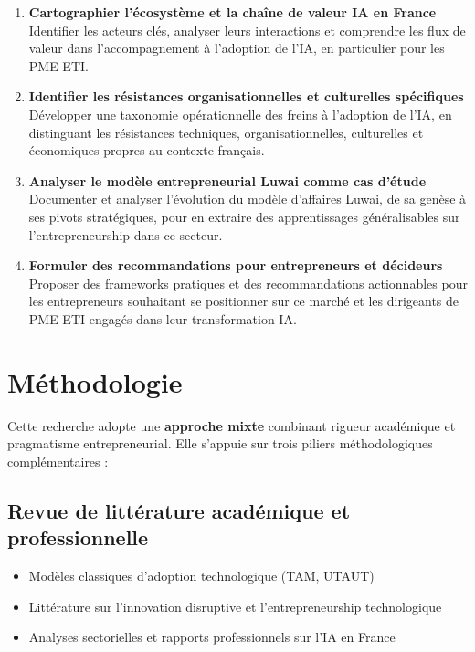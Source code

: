 \begin{enumerate}
    \item \textbf{Cartographier l'écosystème et la chaîne de valeur IA en France}\\
    Identifier les acteurs clés, analyser leurs interactions et comprendre les flux de valeur dans l'accompagnement à l'adoption de l'IA, en particulier pour les PME-ETI.
    \item \textbf{Identifier les résistances organisationnelles et culturelles spécifiques}\\
    Développer une taxonomie opérationnelle des freins à l'adoption de l'IA, en distinguant les résistances techniques, organisationnelles, culturelles et économiques propres au contexte français.
    \item \textbf{Analyser le modèle entrepreneurial Luwai comme cas d'étude}\\
    Documenter et analyser l'évolution du modèle d'affaires Luwai, de sa genèse à ses pivots stratégiques, pour en extraire des apprentissages généralisables sur l'entrepreneurship dans ce secteur.
    \item \textbf{Formuler des recommandations pour entrepreneurs et décideurs}\\
    Proposer des frameworks pratiques et des recommandations actionnables pour les entrepreneurs souhaitant se positionner sur ce marché et les dirigeants de PME-ETI engagés dans leur transformation IA.
\end{enumerate}

\section{Méthodologie}

Cette recherche adopte une \textbf{approche mixte} combinant rigueur académique et pragmatisme entrepreneurial. Elle s'appuie sur trois piliers méthodologiques complémentaires :

\subsection{Revue de littérature académique et professionnelle}
\begin{itemize}
    \item Modèles classiques d'adoption technologique (TAM, UTAUT)
    \item Littérature sur l'innovation disruptive et l'entrepreneurship technologique
    \item Analyses sectorielles et rapports professionnels sur l'IA en France
\end{itemize}


